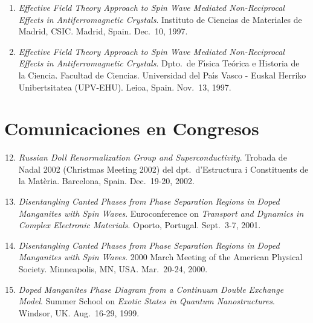\documentclass{article}
\begin{document}
\begin{enumerate}
\item 
{\it Effective Field Theory Approach to Spin Wave Mediated 
Non-Reciprocal Effects in Antiferromagnetic Crystals}. 
Instituto de Ciencias de Materiales de Madrid, CSIC. 
Madrid, Spain.
Dec.~10, 1997. 

\item 
{\it Effective Field Theory Approach to Spin Wave Mediated 
Non-Reciprocal Effects in Antiferromagnetic Crystals}. 
Dpto.\ de F\'{\i}sica Te\'orica e Historia de la Ciencia. 
Facultad de Ciencias. 
Universidad del Pa\'{\i}s Vasco - Euskal Herriko Unibertsitatea (UPV-EHU). 
Leioa, Spain.
Nov.~13, 1997. 
\end{enumerate}


\section*{Comunicaciones en Congresos}

\begin{enumerate}
\setcounter{enumi}{11}
\item
{\it Russian Doll Renormalization Group and Superconductivity}. 
Trobada de Nadal 2002 (Christmas Meeting 2002) del dpt.~d'Estructura 
i Constituents de la Mat\`eria. 
Barcelona, Spain.
Dec.~19-20, 2002.

\item
{\it Disentangling Canted Phases from Phase Separation Regions in Doped 
Manganites with Spin Waves}. 
Euroconference on {\sl Transport and Dynamics in Complex Electronic Materials}.
Oporto, Portugal. 
Sept.~3-7, 2001. 

\item 
{\it Disentangling Canted Phases from Phase
Separation Regions in Doped Manganites with Spin Waves}.
2000 March Meeting of the American Physical Society. 
Minneapolis, MN, USA. 
Mar.~20-24, 2000.

\item 
{\it Doped Manganites Phase Diagram from a Continuum Double Exchange Model}. 
Summer School on {\sl Exotic States in Quantum Nanostructures}. 
Windsor, UK. 
Aug.~16-29, 1999.
\end{enumerate}
\end{document}
